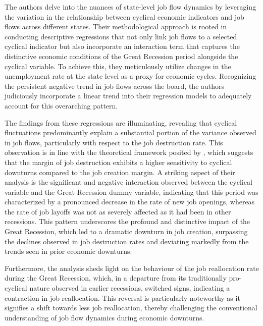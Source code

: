 \documentclass[12pt]{article}
\begin{document}
The authors delve into the nuances of state-level job flow dynamics by leveraging the variation in the relationship
between cyclical economic indicators and job flows across different states. Their methodological approach is rooted in
conducting descriptive regressions that not only link job flows to a selected cyclical indicator but also incorporate an
interaction term that captures the distinctive economic conditions of the Great Recession period alongside the cyclical
variable. To achieve this, they meticulously utilize changes in the unemployment rate at the state level as a proxy for
economic cycles. Recognizing the persistent negative trend in job flows across the board, the authors judiciously
incorporate a linear trend into their regression models to adequately account for this overarching pattern. 

The findings from these regressions are illuminating, revealing that cyclical fluctuations predominantly explain a
substantial portion of the variance observed in job flows, particularly with respect to the job destruction rate. This
observation is in line with the theoretical framework posited by \cite{CabHarm94}, which suggests that the
margin of job destruction exhibits a higher sensitivity to cyclical downturns compared to the job creation margin. A
striking aspect of their analysis is the significant and negative interaction observed between the cyclical variable and
the Great Recession dummy variable, indicating that this period was characterized by a pronounced decrease in the rate
of new job openings, whereas the rate of job layoffs was not as severely affected as it had been in other recessions.
This pattern underscores the profound and distinctive impact of the Great Recession, which led to a dramatic downturn in
job creation, surpassing the declines observed in job destruction rates and deviating markedly from the trends seen in
prior economic downturns. 

Furthermore, the analysis sheds light on the behaviour of the job reallocation rate during the Great Recession, which, in
a departure from its traditionally pro-cyclical nature observed in earlier recessions, switched signs, indicating a
contraction in job reallocation. This reversal is particularly noteworthy as it signifies a shift towards less job
reallocation, thereby challenging the conventional understanding of job flow dynamics during economic downturns. 
\end{document}
